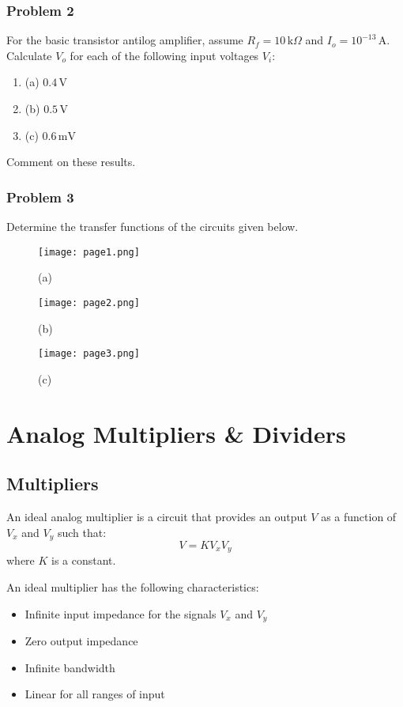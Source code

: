 \documentclass[a4paper,9pt,twoside,openany,twocolumn]{memoir}
\begin{document}
\subsection*{Problem 2}
For the basic transistor antilog amplifier, assume \( R_f = 10 \, \text{k}\Omega \) and \( I_o = 10^{-13} \, \text{A} \). Calculate \( V_o \) for each of the following input voltages \( V_i \):
\begin{enumerate}
    \item (a) \( 0.4 \, \text{V} \)
    \item (b) \( 0.5 \, \text{V} \)
    \item (c) \( 0.6 \, \text{mV} \)
\end{enumerate}
Comment on these results.

\subsection*{Problem 3}
Determine the transfer functions of the circuits given below.
\begin{figure}[H]
    \centering
    \texttt{[image: page1.png]}
    \caption{(a)}
    \label{fig:question_image}
\end{figure}
\begin{figure}[H]
    \centering
    \texttt{[image: page2.png]}
    \caption{(b)}
    \label{fig:question_image}
\end{figure}
\begin{figure}[H]
    \centering
    \texttt{[image: page3.png]}
    \caption{(c)}
    \label{fig:question_image} 
\end{figure} 

\chapter{Analog Multipliers \& Dividers}

\section{Multipliers}
An ideal analog multiplier is a circuit that provides an output \( V \) as a function of \( V_x \) and \( V_y \) such that:
\[
V = K V_x V_y
\]
where \( K \) is a constant.

An ideal multiplier has the following characteristics:
\begin{itemize}
    \item Infinite input impedance for the signals \( V_x \) and \( V_y \)
    \item Zero output impedance
    \item Infinite bandwidth
    \item Linear for all ranges of input
\end{itemize}
\end{document}
